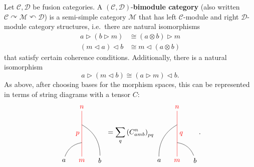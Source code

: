 \begin{definition}
\begin{definition}
	Let $\mathcal{C}, \mathcal{D}$ be fusion categories. A $(\mathcal{C},\mathcal{D})$-\textbf{bimodule category} (also written $\mathcal{C}\curvearrowright\mathcal{M}\curvearrowleft\mathcal{D}$) is a semi-simple category $\mathcal{M}$ that has left $\mathcal{C}$-module and right $\mathcal{D}$-module category structures, i.e.\ there are natural isomorphisms 
		\begin{align}
			a\triangleright(b\triangleright m)&\cong(a\otimes b)\triangleright m\\ 
			(m\triangleleft a)\triangleleft b&\cong m\triangleleft(a\otimes b)
		\end{align}
	that satisfy certain coherence conditions. Additionally, there is a natural isomorphism 
		\begin{equation}
			a\triangleright(m\triangleleft b)\cong (a\triangleright m)\triangleleft b.
		\end{equation}
	As above, after choosing bases for the morphism spaces, this can be represented in terms of string diagrams with a tensor $C$:
		\begin{equation}
			\begin{tikzpicture}[scale=0.9,baseline=(current bounding box.center)]
			\node[red](m) at (0,0) {$m$};
			\node(a) at (-1,0) {$a$};
			\node(b) at (1,0) {$b$};
			\node[red](abm) at (0,3) {$n$};
			\draw[red] (m) to node [left] {$p$} (abm);
			\draw (a) to [bend left] (0,1);
			\draw (b) to [bend right] (0,2);
			\end{tikzpicture}\ =\sum_q\left(C^n_{amb}\right)_{pq}
			\begin{tikzpicture}[scale=0.9,baseline=(current bounding box.center)]
			\node[red](m) at (0,0) {$m$};
			\node(a) at (-1,0) {$a$};
			\node(b) at (1,0) {$b$};
			\node[red](abm) at (0,3) {$n$};
			\draw[red] (m) to node [right] {$q$} (abm);
			\draw (b) to [bend right] (0,1);
			\draw (a) to [bend left] (0,2);
			\end{tikzpicture}.
		\end{equation}
\end{definition}

\end{definition}